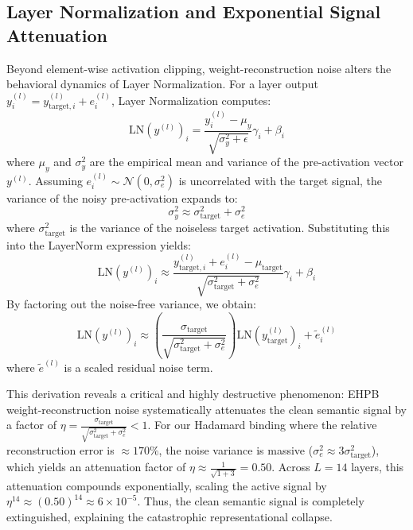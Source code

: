 \documentclass{article}
\theoremstyle{plain}
\theoremstyle{definition}
\theoremstyle{remark}
\begin{document}
\subsection{Layer Normalization and Exponential Signal Attenuation}
Beyond element-wise activation clipping, weight-reconstruction noise alters the behavioral dynamics of Layer Normalization. For a layer output $y_i^{(l)} = y_{\text{target}, i}^{(l)} + e_i^{(l)}$, Layer Normalization computes:
\begin{equation}
\text{LN}\left( y^{(l)} \right)_i = \frac{y_i^{(l)} - \mu_{y}}{\sqrt{\sigma_{y}^2 + \epsilon}} \gamma_i + \beta_i
\end{equation}
where $\mu_y$ and $\sigma_y^2$ are the empirical mean and variance of the pre-activation vector $y^{(l)}$. Assuming $e_i^{(l)} \sim \mathcal{N}(0, \sigma_e^2)$ is uncorrelated with the target signal, the variance of the noisy pre-activation expands to:
\begin{equation}
\sigma_y^2 \approx \sigma_{\text{target}}^2 + \sigma_e^2
\end{equation}
where $\sigma_{\text{target}}^2$ is the variance of the noiseless target activation. Substituting this into the LayerNorm expression yields:
\begin{equation}
\text{LN}\left( y^{(l)} \right)_i \approx \frac{y_{\text{target}, i}^{(l)} + e_i^{(l)} - \mu_{\text{target}}}{\sqrt{\sigma_{\text{target}}^2 + \sigma_e^2}} \gamma_i + \beta_i
\end{equation}
By factoring out the noise-free variance, we obtain:
\begin{equation}
\text{LN}\left( y^{(l)} \right)_i \approx \left( \frac{\sigma_{\text{target}}}{\sqrt{\sigma_{\text{target}}^2 + \sigma_e^2}} \right) \text{LN}\left( y_{\text{target}}^{(l)} \right)_i + \tilde{e}_i^{(l)}
\end{equation}
where $\tilde{e}^{(l)}$ is a scaled residual noise term.

This derivation reveals a critical and highly destructive phenomenon: EHPB weight-reconstruction noise systematically attenuates the clean semantic signal by a factor of $\eta = \frac{\sigma_{\text{target}}}{\sqrt{\sigma_{\text{target}}^2 + \sigma_e^2}} < 1$. For our Hadamard binding where the relative reconstruction error is $\approx 170\%$, the noise variance is massive ($\sigma_e^2 \approx 3 \sigma_{\text{target}}^2$), which yields an attenuation factor of $\eta \approx \frac{1}{\sqrt{1 + 3}} = 0.50$. Across $L=14$ layers, this attenuation compounds exponentially, scaling the active signal by $\eta^{14} \approx (0.50)^{14} \approx 6 \times 10^{-5}$. Thus, the clean semantic signal is completely extinguished, explaining the catastrophic representational collapse.
\end{document}
